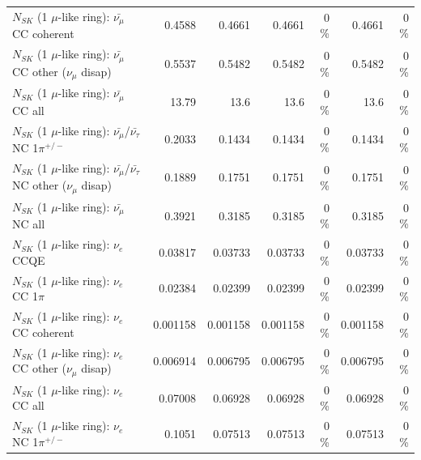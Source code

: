 \begin{table}
\begin{tabular}{| l | r | r | r  r | r  r |}
                       $N_{SK}$ (1 $\mu$-like ring): $\bar{\nu_\mu}$ CC coherent &          0.4588 &          0.4661 &          0.4661 &        0 \%  &          0.4661 &        0 \%  \\ 
        $N_{SK}$ (1 $\mu$-like ring): $\bar{\nu_\mu}$ CC other ($\nu_\mu$ disap) &          0.5537 &          0.5482 &          0.5482 &        0 \%  &          0.5482 &        0 \%  \\ 
                          $N_{SK}$ (1 $\mu$-like ring): $\bar{\nu_{\mu}}$ CC all &           13.79 &            13.6 &            13.6 &        0 \%  &            13.6 &        0 \%  \\ 
\hline
  $N_{SK}$ (1 $\mu$-like ring): $\bar{\nu_\mu}$/$\bar{\nu_\tau}$ NC 1$\pi^{+/-}$ &          0.2033 &          0.1434 &          0.1434 &        0 \%  &          0.1434 &        0 \%  \\ 
$N_{SK}$ (1 $\mu$-like ring): $\bar{\nu_\mu}$/$\bar{\nu_\tau}$ NC other ($\nu_\mu$ disap) &          0.1889 &          0.1751 &          0.1751 &        0 \%  &          0.1751 &        0 \%  \\ 
                          $N_{SK}$ (1 $\mu$-like ring): $\bar{\nu_{\mu}}$ NC all &          0.3921 &          0.3185 &          0.3185 &        0 \%  &          0.3185 &        0 \%  \\ 
\hline
\hline
\hline
                                      $N_{SK}$ (1 $\mu$-like ring): $\nu_e$ CCQE &         0.03817 &         0.03733 &         0.03733 &        0 \%  &         0.03733 &        0 \%  \\ 
                                 $N_{SK}$ (1 $\mu$-like ring): $\nu_e$ CC 1$\pi$ &         0.02384 &         0.02399 &         0.02399 &        0 \%  &         0.02399 &        0 \%  \\ 
                               $N_{SK}$ (1 $\mu$-like ring): $\nu_e$ CC coherent &        0.001158 &        0.001158 &        0.001158 &        0 \%  &        0.001158 &        0 \%  \\ 
                $N_{SK}$ (1 $\mu$-like ring): $\nu_e$ CC other ($\nu_\mu$ disap) &        0.006914 &        0.006795 &        0.006795 &        0 \%  &        0.006795 &        0 \%  \\ 
                                  $N_{SK}$ (1 $\mu$-like ring): $\nu_{e}$ CC all &         0.07008 &         0.06928 &         0.06928 &        0 \%  &         0.06928 &        0 \%  \\ 
\hline
                           $N_{SK}$ (1 $\mu$-like ring): $\nu_e$ NC 1$\pi^{+/-}$ &          0.1051 &         0.07513 &         0.07513 &        0 \%  &         0.07513 &        0 \%  \\ 

\end{tabular}
\end{table}
